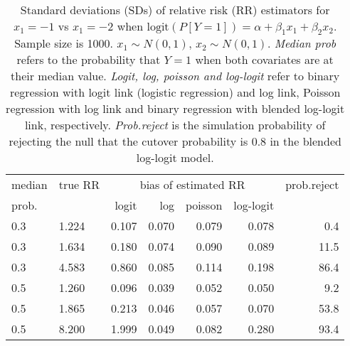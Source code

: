 \documentclass[12pt,a4paper]{article}
\begin{document}
\begin{table}[H] 
\small\sf\centering 
\caption{Standard deviations (SDs) of relative risk (RR) estimators for $x_1=-1$ vs $x_1=-2$ when $\mbox{logit}(P[Y=1])=\alpha+\beta_1 x_1 + \beta_2 x_2$. Sample size is 1000. $x_1 \sim $$N(0,1)$, $x_2 \sim N(0,1)$. {\it Median prob} refers to the probability that $Y=1$ when both covariates are at their median value. {\it Logit, log, poisson and log-logit} refer to binary regression with logit link (logistic regression) and log link, Poisson regression with log link and binary regression with blended log-logit link, respectively. {\it Prob.reject} is the simulation probability of rejecting the null that the cutover probability is $0.8$ in the blended log-logit model.} 
\begin{tabular}{llrrrrr} 
\toprule 
median & true RR & \multicolumn{4}{c}{bias of estimated RR} & prob.reject \\ 
prob. & & logit & log & poisson & log-logit  & \\ \midrule 
0.3 & 1.224 & 0.107 & 0.070 & 0.079 & 0.078 &  0.4 \\  
0.3 & 1.634 & 0.180 & 0.074 & 0.090 & 0.089 & 11.5 \\  
0.3 & 4.583 & 0.860 & 0.085 & 0.114 & 0.198 & 86.4 \\  
0.5 & 1.260 & 0.096 & 0.039 & 0.052 & 0.050 &  9.2 \\  
0.5 & 1.865 & 0.213 & 0.046 & 0.057 & 0.070 & 53.8 \\  
0.5 & 8.200 & 1.999 & 0.049 & 0.082 & 0.280 & 93.4 \\  
\bottomrule 
\end{tabular} 
\end{table} 
\end{document}
